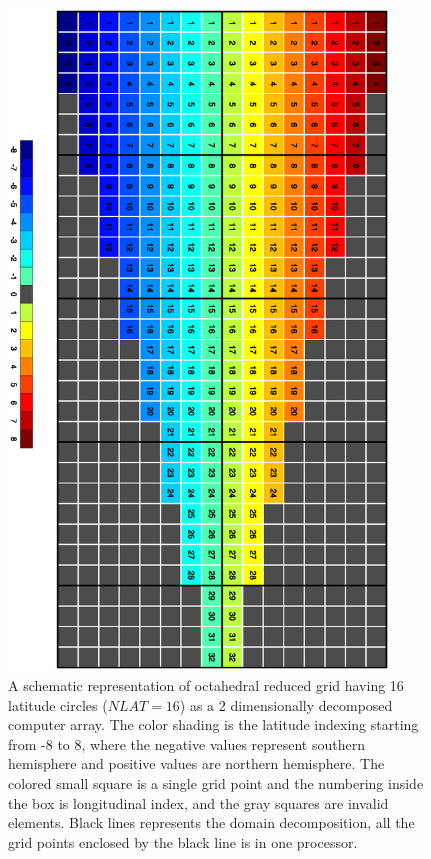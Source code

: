 \documentclass{SBCbookchapter}
\begin{document}
\begin{figure}[H]
	\centering
	\includegraphics[angle=90,width=0.9\textwidth]{grid3.eps}
	\caption{A schematic representation of octahedral reduced grid having 16 latitude circles ($NLAT=16$) as a 2 dimensionally decomposed computer array. The color shading is the latitude indexing starting from -8 to 8, where the negative values represent southern hemisphere and positive values are northern hemisphere. The colored small square is a single grid point and the numbering inside the box is longitudinal index, and the gray squares are invalid elements. Black lines represents the domain decomposition, all the grid points enclosed by the black line is in one processor.}
	\label{fig2}
\end{figure}
\end{document}
